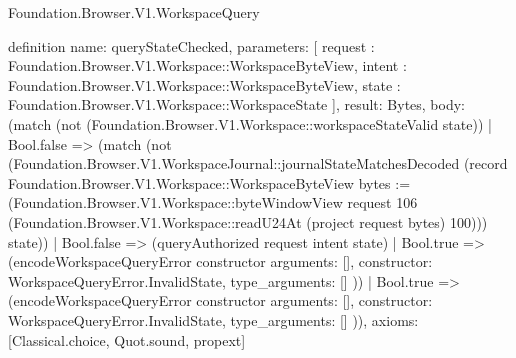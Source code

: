 \begin{lexlean}{Foundation.Browser.V1.WorkspaceQuery}
\begin{semanticmodule}
definition{
  name: queryStateChecked,
  parameters: [
    request : Foundation.Browser.V1.Workspace::WorkspaceByteView,
    intent : Foundation.Browser.V1.Workspace::WorkspaceByteView,
    state : Foundation.Browser.V1.Workspace::WorkspaceState
  ],
  result: Bytes,
  body: (match (not (Foundation.Browser.V1.Workspace::workspaceStateValid state))
    | Bool.false => (match (not (Foundation.Browser.V1.WorkspaceJournal::journalStateMatchesDecoded (record Foundation.Browser.V1.Workspace::WorkspaceByteView {bytes := (Foundation.Browser.V1.Workspace::byteWindowView request 106 (Foundation.Browser.V1.Workspace::readU24At (project request bytes) 100))}) state))
      | Bool.false => (queryAuthorized request intent state)
      | Bool.true => (encodeWorkspaceQueryError constructor{
        arguments: [],
        constructor: WorkspaceQueryError.InvalidState,
        type_arguments: []
      }))
    | Bool.true => (encodeWorkspaceQueryError constructor{
      arguments: [],
      constructor: WorkspaceQueryError.InvalidState,
      type_arguments: []
    })),
  axioms: [Classical.choice, Quot.sound, propext]
}


\end{semanticmodule}
\end{lexlean}
